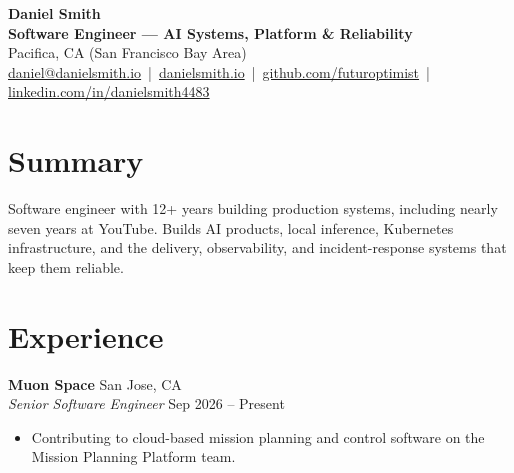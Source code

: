 \documentclass[11pt]{article}
\begin{document}
\begin{center}
  {\LARGE\textbf{Daniel Smith}}\\[0.5mm]
  {\large\textbf{Software Engineer --- AI Systems, Platform \& Reliability}}\\[0.7mm]
  Pacifica, CA (San Francisco Bay Area)\\[0.4mm]
  \href{mailto:daniel@danielsmith.io}{daniel@danielsmith.io} \,|\,
  \href{https://danielsmith.io}{danielsmith.io} \,|\,
  \href{https://github.com/futuroptimist}{github.com/futuroptimist} \,|\,
  \href{https://linkedin.com/in/danielsmith4483}{linkedin.com/in/danielsmith4483}
\end{center}

\vspace{-2.8mm}
\section*{Summary}
Software engineer with 12+ years building production systems, including nearly seven years at
YouTube. Builds AI products, local inference, Kubernetes infrastructure, and the delivery,
observability, and incident-response systems that keep them reliable.

\section*{Experience}
\textbf{Muon Space} \hfill San Jose, CA\\
\textit{Senior Software Engineer} \hfill Sep 2026 -- Present
\begin{itemize}
  \item Contributing to cloud-based mission planning and control software on the Mission
  Planning Platform team.
\end{itemize}
\end{document}
